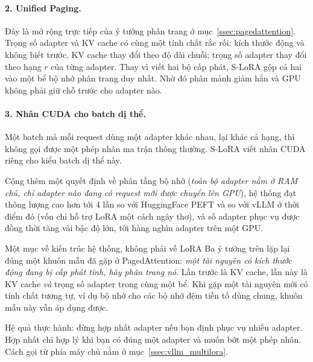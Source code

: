 \paragraph{2. Unified Paging.} Đây là mở rộng trực tiếp của ý tưởng phân trang ở mục~\ref{ssec:pagedattention}. Trọng số adapter và KV cache có cùng một tính chất rắc rối: kích thước động và không biết trước. KV cache thay đổi theo độ dài chuỗi; trọng số adapter thay đổi theo hạng $r$ của từng adapter. Thay vì viết hai bộ cấp phát, S-LoRA gộp cả hai vào một bể bộ nhớ phân trang duy nhất. Nhờ đó phân mảnh giảm hẳn và GPU không phải giữ chỗ trước cho adapter nào.

\paragraph{3. Nhân CUDA cho batch dị thể.} Một batch mà mỗi request dùng một adapter khác nhau, lại khác cả hạng, thì không gọi được một phép nhân ma trận thông thường. S-LoRA viết nhân CUDA riêng cho kiểu batch dị thể này.

Cộng thêm một quyết định về phân tầng bộ nhớ (\emph{toàn bộ adapter nằm ở RAM chủ, chỉ adapter nào đang có request mới được chuyển lên GPU}), hệ thống đạt thông lượng cao hơn tới 4 lần so với HuggingFace PEFT và so với vLLM ở thời điểm đó (vốn chỉ hỗ trợ LoRA một cách ngây thơ), và số adapter phục vụ được đồng thời tăng vài bậc độ lớn, tới hàng nghìn adapter trên một GPU.

\begin{deepdive}{Một mục về kiến trúc hệ thống, không phải về LoRA}
Ba ý tưởng trên lặp lại đúng một khuôn mẫu đã gặp ở PagedAttention: \emph{một tài nguyên có kích thước động đang bị cấp phát tĩnh, hãy phân trang nó}. Lần trước là KV cache, lần này là KV cache \emph{và} trọng số adapter trong cùng một bể. Khi gặp một tài nguyên mới có tính chất tương tự, ví dụ bộ nhớ cho các bộ nhớ đệm tiền tố dùng chung, khuôn mẫu này vẫn áp dụng được.

Hệ quả thực hành: đừng hợp nhất adapter nếu bạn định phục vụ nhiều adapter. Hợp nhất chỉ hợp lý khi bạn có đúng một adapter và muốn bớt một phép nhân. Cách gọi từ phía máy chủ nằm ở mục~\ref{ssec:vllm_multilora}.
\end{deepdive}

